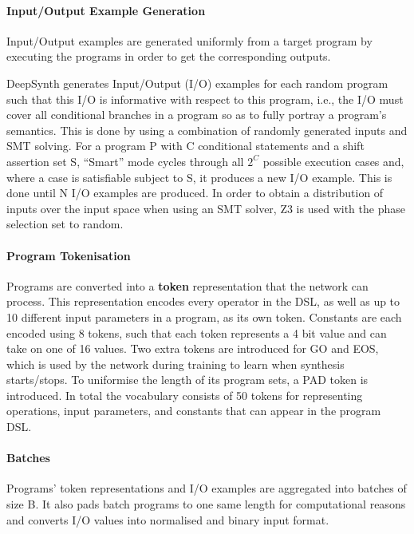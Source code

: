 \paragraph{Input/Output Example Generation}
Input/Output examples are generated uniformly from a target program by executing the programs in order to get the corresponding outputs.

DeepSynth generates Input/Output (I/O) examples for each random program such that this I/O is informative with respect to this program, i.e., the I/O must cover all conditional branches in a program so as to fully portray a program’s semantics. This is done by using a combination of randomly generated inputs and SMT solving. For a program P with C conditional statements and a shift assertion set S, “Smart” mode cycles through all $2^C$ possible execution cases and, where a case is satisfiable subject to S, it produces a new I/O example. This is done until N I/O examples are produced. In order to obtain a distribution of inputs over the input space when using an SMT solver, Z3 is used with the phase selection set to random.

\paragraph{Program Tokenisation}
Programs are converted into a \textbf{token} representation that the network can process. This representation encodes every operator in the DSL, as well as up to 10 different input parameters in a program, as its own token. Constants are each encoded using 8 tokens, such that each token represents a 4 bit value and can take on one of 16 values. 
Two extra tokens are introduced for GO and EOS, which is used by the network during training to learn when synthesis starts/stops. To uniformise the length of its program sets, a PAD token is introduced. In total the vocabulary consists of 50 tokens for representing operations, input parameters, and constants that can appear in the program DSL.

\paragraph{Batches} Programs’ token representations and I/O examples are aggregated into batches of size B. It also pads batch programs to one same length for computational reasons and converts I/O values into normalised and binary input format.